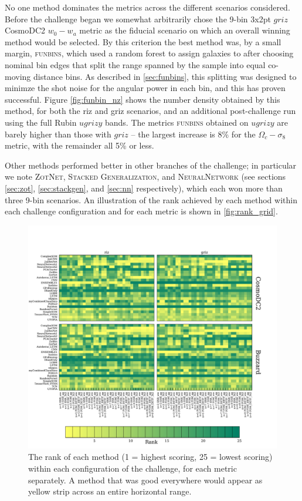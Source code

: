 \documentclass[twocolumn,twocolappendix]{aastex63}
\begin{document}
No one method dominates the metrics across the different scenarios considered.
Before the challenge began we somewhat arbitrarily chose 
the 9-bin 3x2pt $griz$ CosmoDC2 $w_0-w_a$ metric as the fiducial scenario on which
an overall winning method would be selected.
By this criterion the best method was, by a small margin, \textsc{funbins},
which used a random forest to assign galaxies to after choosing nominal bin edges that split 
the range spanned
by the sample into equal co-moving distance bins. 
As described in \autoref{sec:funbins},  this splitting was designed
to minimze the shot noise for the angular power in each bin, and this has proven successful. 
Figure \ref{fig:funbin_nz} shows the number density obtained by this method, for both the riz and griz 
scenarios, and an additional post-challenge run using the full Rubin $ugrizy$ bands.
The metrics \textsc{funbins}
obtained on $ugrizy$ are barely higher than those with $griz$ -- the largest
increase is 8\% for the $\Omega_c-\sigma_8$ metric, with the remainder all 5\% or less.

Other methods performed better in other branches of the challenge; in particular we note \textsc{ZotNet}, \textsc{Stacked Generalization}, and \textsc{NeuralNetwork} (see sections \ref{sec:zot}, \ref{sec:stackgen}, and \ref{sec:nn} respectively), which each won more than three 9-bin scenarios. An illustration of the rank achieved by each method within each challenge configuration and for each metric
is shown in \autoref{fig:rank_grid}.



\begin{figure}[htbp]
	\includegraphics[width=\linewidth]{results/rank_grid.pdf}
	\caption{The rank of each method (1 = highest scoring, 25 = lowest scoring) within each configuration of the challenge, for each metric separately.  A method that was good everywhere would appear as yellow strip across an entire horizontal range.}
	\label{fig:rank_grid}
\end{figure}
\end{document}
